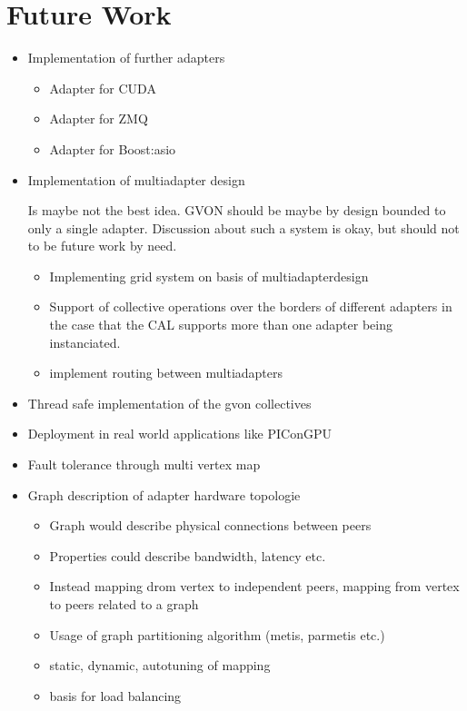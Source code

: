 \chapter{Future Work}
\label{sec:futurework}

\begin{itemize}

\item Implementation of further adapters
  \begin{itemize}
  \item Adapter for CUDA
  \item Adapter for ZMQ
  \item Adapter for Boost:asio
  \end{itemize}

\item Implementation of multiadapter design
  
  Is maybe not the best idea. GVON should be maybe by design
  bounded to only a single adapter. Discussion about such
  a system is okay, but should not to be future work by need.
  \begin{itemize}
  \item Implementing grid system on basis of multiadapterdesign
  \item Support of collective operations over the borders
    of different adapters in the case that the CAL supports more than one adapter
    being instanciated.
  \item implement routing between multiadapters
  \end{itemize}

\item Thread safe implementation of the gvon collectives

\item Deployment in real world applications like PIConGPU

\item Fault tolerance through multi vertex map

\item Graph description of adapter hardware topologie
  \begin{itemize}
  \item Graph would describe physical connections between peers
  \item Properties could describe bandwidth, latency etc. 
  \item Instead mapping drom vertex to independent peers, mapping
    from vertex to peers related to a graph
  \item Usage of graph partitioning algorithm (metis, parmetis etc.)
  \item static, dynamic, autotuning of mapping
  \item basis for load balancing
  \end{itemize}


\end{itemize}
